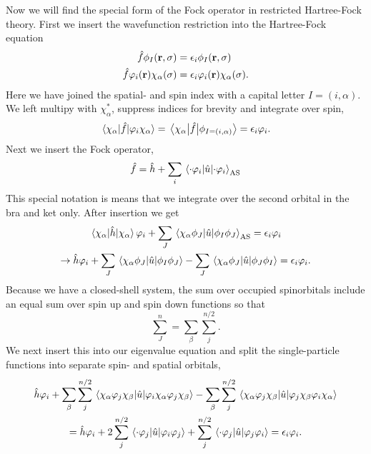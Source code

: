 Now we will find the special form of the Fock operator in restricted 
Hartree-Fock theory. First we insert the wavefunction restriction into 
the Hartree-Fock equation
\begin{equation}
    \begin{aligned}
        \hat{f}\phi_I(\vb{r}, \sigma) &= \epsilon_i \phi_I(\vb{r}, \sigma) \\
        \hat{f}\varphi_i(\vb{r}) \chi_\alpha(\sigma)
        &= \epsilon_i \varphi_i(\vb{r})\chi_\alpha(\sigma).
    \end{aligned}
\end{equation}
Here we have joined the spatial- and spin index with a capital letter $I = (i, \alpha)$.
We left multipy with $\chi_\alpha^*$, suppress indices for brevity and integrate over spin,
\begin{equation}
    \mel{\chi_\alpha}{\hat{f}}{\varphi_i\chi_\alpha}
    = \mel{\chi_\alpha}{\hat{f}}{\phi_{I = (i,\alpha)}}
    = \epsilon_i\varphi_i.
\end{equation}
Next we insert the Fock operator,
\begin{equation*}
    \hat{f} = \hat{h} + \sum_i\mel{\cdot\varphi_i}{\hat{u}}{\cdot\varphi_i}_\text{AS}
\end{equation*} 
This special notation is means that we integrate over the second orbital in 
the bra and ket only. After insertion we get
\begin{equation}
   \begin{gathered}
        \mel{\chi_\alpha}{\hat{h}}{\chi_\alpha}\varphi_i
        + \sum_J \mel{\chi_\alpha\phi_J}{\hat{u}}{\phi_I\phi_J}_\text{AS}
        = \epsilon_i\varphi_i \\
        \to\hat{h}\varphi_i 
        + \sum_J \mel{\chi_\alpha\phi_J}{\hat{u}}{\phi_I\phi_J}
        - \sum_J \mel{\chi_\alpha\phi_J}{\hat{u}}{\phi_J\phi_I}
        = \epsilon_i\varphi_i.
   \end{gathered} 
\end{equation}
Because we have a closed-shell system, the sum over occupied spinorbitals include an 
equal sum over spin up and spin down functions so that
\begin{equation*}
    \sum_J^n = \sum_\beta\sum_j^{n/2}.
\end{equation*} 
We next insert this into our eigenvalue equation and split the single-particle functions 
into separate spin- and spatial orbitals,
\begin{equation}
    \begin{gathered}
        \hat{h}\varphi_i 
        + \sum_\beta\sum_j^{n/2}
            \mel{\chi_\alpha\varphi_j\chi_\beta}{\hat{u}}{\varphi_i\chi_\alpha\varphi_j\chi_\beta} 
        - \sum_\beta\sum_j^{n/2}
            \mel{\chi_\alpha\varphi_j\chi_\beta}{\hat{u}}{\varphi_j\chi_\beta\varphi_i\chi_\alpha} \\
        = \hat{h}\varphi_i 
        + 2\sum_j^{n/2} \mel{\cdot \varphi_j}{\hat{u}}{\varphi_i\varphi_j}
        +  \sum_j^{n/2} \mel{\cdot \varphi_j}{\hat{u}}{\varphi_j\varphi_i}
        = \epsilon_i\varphi_i.
    \end{gathered}
\end{equation}
